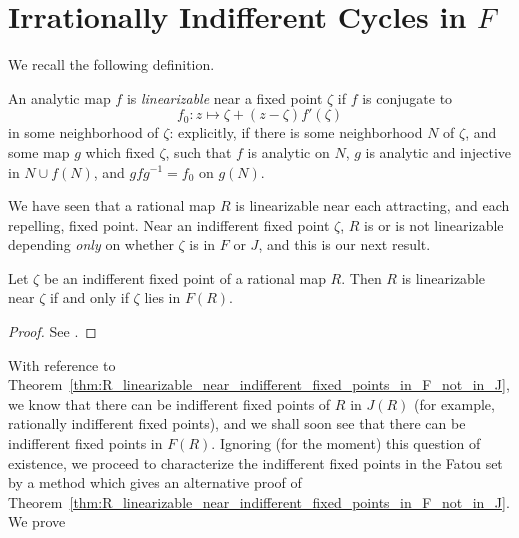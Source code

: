 \section{Irrationally Indifferent Cycles in $F$}
\label{sec:irrationally_indifferent_cycles_in_F}

We recall the following definition.

\begin{definition}
    An analytic map $f$ is \emph{linearizable} near a fixed point $\zeta$ if $f$
    is conjugate to
    \begin{equation*}
        f_0: z \mapsto \zeta + (z - \zeta) f'(\zeta)
    \end{equation*}
    in some neighborhood of $\zeta$: explicitly, if there is some neighborhood
    $N$ of $\zeta$, and some map $g$ which fixed $\zeta$, such that $f$ is
    analytic on $N$, $g$ is analytic and injective in $N \cup f(N)$, and $g f
    g^{-1} = f_0$ on $g(N)$.
\end{definition}

We have seen that a rational map $R$ is linearizable near each attracting, and
each repelling, fixed point. Near an indifferent fixed point $\zeta$, $R$ is or
is not linearizable depending \emph{only} on whether $\zeta$ is in $F$ or $J$,
and this is our next result.

\begin{theorem}
    \label{thm:R_linearizable_near_indifferent_fixed_points_in_F_not_in_J}
    Let $\zeta$ be an indifferent fixed point of a rational map $R$. Then $R$ is
    linearizable near $\zeta$ if and only if $\zeta$ lies in $F(R)$.
\end{theorem}
\begin{proof}
    See \cite[133]{Beardon1991}.
\end{proof}

With reference to
Theorem~\ref{thm:R_linearizable_near_indifferent_fixed_points_in_F_not_in_J}, we
know that there can be indifferent fixed points of $R$ in $J(R)$ (for example,
rationally indifferent fixed points), and we shall soon see that there can be
indifferent fixed points in $F(R)$. Ignoring (for the moment) this question of
existence, we proceed to characterize the indifferent fixed points in the Fatou
set by a method which gives an alternative proof of
Theorem~\ref{thm:R_linearizable_near_indifferent_fixed_points_in_F_not_in_J}. We
prove

